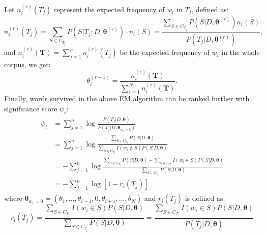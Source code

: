 \documentclass[12pt]{article}
\begin{document}
Let $n_i^{(r)}(T_j)$ represent the expected frequency of $w_i$ in $T_j$, defined as:
$$ n_i^{(r)}(T_j) = \sum_{S \in C_{T_j}} P(S|T_j; D, \bm{\theta}^{(r)}) \cdot n_i(S) = \frac{\sum_{S \in C_{T_j}} P(S|D, \bm{\theta}^{(r)})n_i(S)}{P(T_j|D, \bm{\theta}^{(r)})}, $$
and $n_i^{(r)}(\bm{T}) = \sum_{j=1}^n n_i^{(r)} (T_j)$ be the expected frequency of $w_i$ in the whole corpus, we get:
$$ \theta_i^{(r+1)} = \frac{n_i^{(r)}(\bm{T})}{\sum_{i=1}^N n_i^{(r)}(\bm{T})}. $$
Finally, words survived in the above EM algorithm can be ranked further with significance score $\psi_i$:
\begin{align*}
\psi_i &= \sum_{j=1}^n \log \frac{P(T_j|D, \bm{\theta})}{P(T_j|D, \bm{\theta}_{w_i=0})} \\
&= \sum_{j=1}^n \log \frac{\sum_{S \in C_{T_j}}P(S|D, \bm{\theta})}{\sum_{S \in C_{T_j}} I(w_i \notin S)P(S|D, \bm{\theta})} \\
&= -\sum_{j=1}^n \log \frac{\sum_{S \in C_{T_j}}P(S|D, \bm{\theta}) - \sum_{S \in C_{T_j}} I(w_i \in S)P(S|D, \bm{\theta})}{\sum_{S \in C_{T_j}}P(S|D, \bm{\theta})} \\
&= -\sum_{j=1}^n \log [1 - r_i(T_j)]
\end{align*}
$$ . $$
where $\bm{\theta}_{w_i=0} = (\theta_1, ..., \theta_{i-1}, 0, \theta_{i+1}, ..., \theta_N)$ and $r_i(T_j)$ is defined as:
$$ r_i(T_j) = \frac{\sum_{S \in C_{T_j}} I(w_i \in S)P(S|D, \bm{\theta})}{\sum_{S \in C_{T_j}}P(S|D, \bm{\theta})} = \frac{\sum_{S \in C_{T_j}} I(w_i \in S)P(S|D, \bm{\theta})}{P(T_j|D, \bm{\theta})} $$ 
\end{document}
